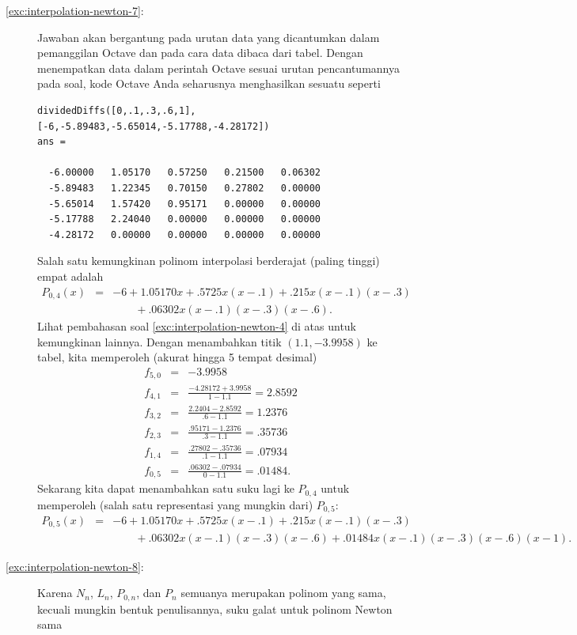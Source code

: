 \begin{description}
\item [{\ref{exc:interpolation-newton-7}:}] Jawaban akan bergantung pada
urutan data yang dicantumkan dalam pemanggilan Octave dan pada cara
data dibaca dari tabel. Dengan menempatkan data dalam perintah Octave
sesuai urutan pencantumannya pada soal, kode Octave Anda seharusnya
menghasilkan sesuatu seperti \begin{verbatim}
dividedDiffs([0,.1,.3,.6,1],[-6,-5.89483,-5.65014,-5.17788,-4.28172])
ans =

  -6.00000   1.05170   0.57250   0.21500   0.06302
  -5.89483   1.22345   0.70150   0.27802   0.00000
  -5.65014   1.57420   0.95171   0.00000   0.00000
  -5.17788   2.24040   0.00000   0.00000   0.00000
  -4.28172   0.00000   0.00000   0.00000   0.00000
\end{verbatim}Salah satu kemungkinan polinom interpolasi berderajat (paling tinggi)
empat adalah
\begin{eqnarray*}
P_{0,4}(x) & = & -6+1.05170x+.5725x(x-.1)+.215x(x-.1)(x-.3)\\
 &  & \qquad+.06302x(x-.1)(x-.3)(x-.6).
\end{eqnarray*}
Lihat pembahasan soal \ref{exc:interpolation-newton-4} di atas untuk
kemungkinan lainnya. Dengan menambahkan titik $(1.1,-3.9958)$ ke
tabel, kita memperoleh (akurat hingga 5 tempat desimal)
\begin{eqnarray*}
f_{5,0} & = & -3.9958\\
f_{4,1} & = & \frac{-4.28172+3.9958}{1-1.1}=2.8592\\
f_{3,2} & = & \frac{2.2404-2.8592}{.6-1.1}=1.2376\\
f_{2,3} & = & \frac{.95171-1.2376}{.3-1.1}=.35736\\
f_{1,4} & = & \frac{.27802-.35736}{.1-1.1}=.07934\\
f_{0,5} & = & \frac{.06302-.07934}{0-1.1}=.01484.
\end{eqnarray*}
Sekarang kita dapat menambahkan satu suku lagi ke $P_{0,4}$ untuk
memperoleh (salah satu representasi yang mungkin dari) $P_{0,5}$:
\begin{eqnarray*}
P_{0,5}(x) & = & -6+1.05170x+.5725x(x-.1)+.215x(x-.1)(x-.3)\\
 &  & \qquad+.06302x(x-.1)(x-.3)(x-.6)+.01484x(x-.1)(x-.3)(x-.6)(x-1).
\end{eqnarray*}
\item [{\ref{exc:interpolation-newton-8}:}] Karena $N_{n}$, $L_{n}$,
$P_{0,n}$, dan $P_{n}$ semuanya merupakan polinom yang sama, kecuali
mungkin bentuk penulisannya, suku galat untuk polinom Newton sama

\end{description}
